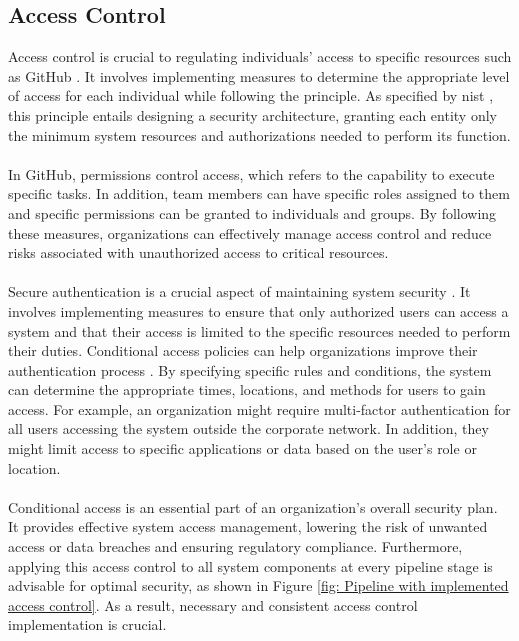 \subsection{Access Control}
Access control is crucial to regulating individuals' access to specific resources such as GitHub \cite{accesscontroll}. It involves implementing measures to determine the appropriate level of access for each individual while following the  principle. As specified by \acrshort{nist} \cite{leastprivilege}, this principle entails designing a security architecture, granting each entity only the minimum system resources and authorizations needed to perform its function. 
\\~\\
In GitHub, permissions control access, which refers to the capability to execute specific tasks. In addition, team members can have specific roles assigned to them and specific permissions can be granted to individuals and groups. By following these measures, organizations can effectively manage access control and reduce risks associated with unauthorized access to critical resources. 
\\~\\
Secure authentication is a crucial aspect of maintaining system security \cite{iso27002}. It involves implementing measures to ensure that only authorized users can access a system and that their access is limited to the specific resources needed to perform their duties. Conditional access policies can help organizations improve their authentication process \cite{conditionalaccess}. By specifying specific rules and conditions, the system can determine the appropriate times, locations, and methods for users to gain access. For example, an organization might require multi-factor authentication for all users accessing the system outside the corporate network. In addition, they might limit access to specific applications or data based on the user's role or location.
\\~\\
Conditional access is an essential part of an organization's overall security plan. It provides effective system access management, lowering the risk of unwanted access or data breaches and ensuring regulatory compliance. Furthermore, applying this access control to all system components at every pipeline stage is advisable for optimal security, as shown in Figure \ref{fig: Pipeline with implemented access control}. As a result, necessary and consistent access control implementation is crucial.

